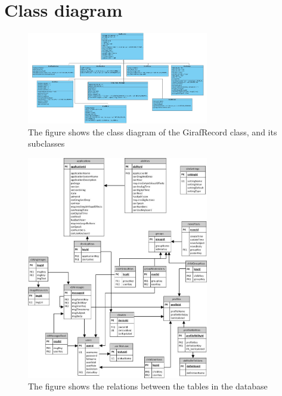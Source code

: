 \chapter{Class diagram}
\label{diagramAppendix}

\begin{figure}[!ht]
\centering
\includegraphics[angle=90,width=300px]{img/classdiagram_Fixed.jpg}
\caption{The figure shows the class diagram of the GirafRecord class, and its subclasses}
\label{fig:diagram}
\end{figure}

\begin{figure}[!ht]
\centering
\includegraphics[angle=0,width=300px]{img/ER-relation(1).jpg}
\caption{The figure shows the relations between the tables in the database}
\label{fig:database_relations}
\end{figure}